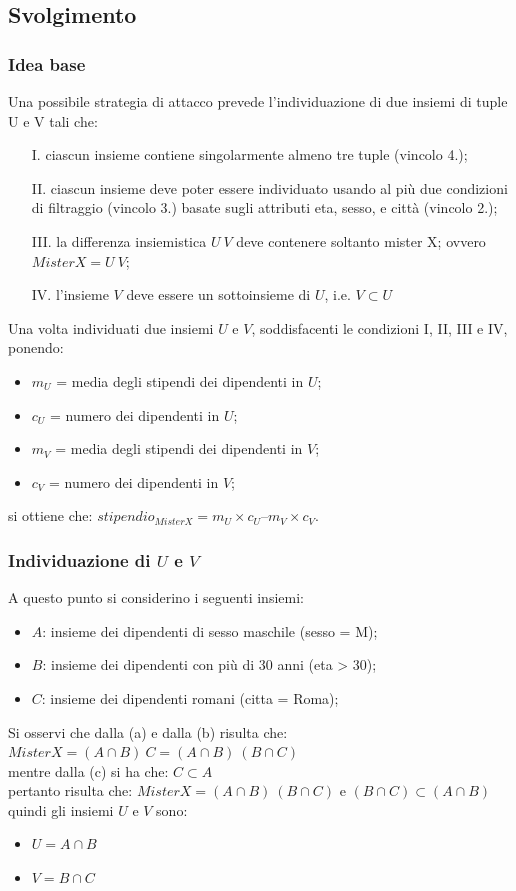 \subsection{Svolgimento}
\subsubsection{Idea base}
Una possibile strategia di attacco prevede l'individuazione di due insiemi di tuple U e V tali che:
\begin{enumerate}
\item [I.] ciascun insieme contiene singolarmente almeno tre tuple (vincolo 4.);
\item [II.] ciascun insieme deve poter essere individuato usando al più due condizioni di filtraggio (vincolo 3.) basate sugli attributi eta, sesso, e città (vincolo 2.);
\item [III.] la differenza insiemistica $U \ V$ deve contenere soltanto mister X; ovvero ${Mister X} = U \ V$;
\item [IV.] l'insieme $V$ deve essere un sottoinsieme di $U$, i.e. $V \subset U$
\end{enumerate}
Una volta individuati due insiemi $U$ e $V$, soddisfacenti le condizioni I, II, III e IV, ponendo:
\begin{itemize}
\item $m_{U}$ = media degli stipendi dei dipendenti in $U$;
\item $c_{U}$ = numero dei dipendenti in $U$;
\item $m_{V}$ = media degli stipendi dei dipendenti in $V$;
\item $c_{V}$ = numero dei dipendenti in $V$;
\end{itemize}
si ottiene che: $stipendio_{Mister X} = m_{U} \times c_{U} – m_{V} \times c_{V}$.\\
\subsubsection{Individuazione di $U$ e $V$}
A questo punto si considerino i seguenti insiemi:
\begin{itemize}
\item $A$: insieme dei dipendenti di sesso maschile (sesso = M);
\item $B$: insieme dei dipendenti con più di 30 anni (eta > 30);
\item $C$: insieme dei dipendenti romani (citta = Roma);
\end{itemize}
Si osservi che dalla (a) e dalla (b) risulta che: ${Mister X} = (A \cap B) \ C = (A \cap B) \ (B \cap C)$\\
mentre dalla (c) si ha che: $C \subset A$\\
pertanto risulta che: ${Mister X} = (A \cap B) \ (B \cap C)$ e $(B \cap C) \subset (A \cap B)$\\
quindi gli insiemi $U$ e $V$ sono:
\begin{itemize}
\item $U = A \cap B$
\item $V = B \cap C$
\end{itemize}
